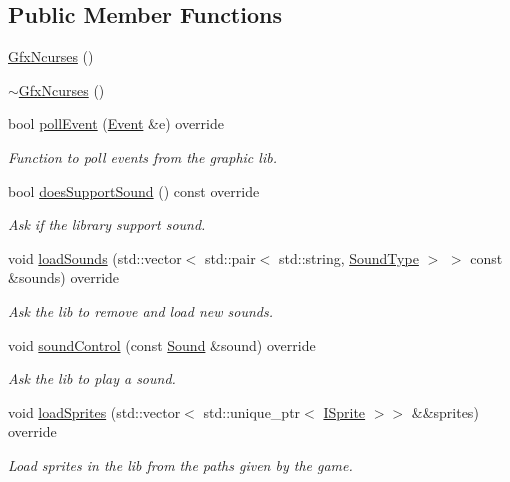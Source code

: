 \subsection*{Public Member Functions}
\begin{DoxyCompactItemize}
\item 
\hyperlink{classarcade_1_1_gfx_ncurses_a0408b1bf8ad9b35de30d82fe2c0512f2}{Gfx\+Ncurses} ()
\item 
\hyperlink{classarcade_1_1_gfx_ncurses_a462de36e41ccd26eba4e908ee3603a4b}{$\sim$\+Gfx\+Ncurses} ()
\item 
bool \hyperlink{classarcade_1_1_gfx_ncurses_aa16f7c823041b931025f750b4050318a}{poll\+Event} (\hyperlink{structarcade_1_1_event}{Event} \&e) override
\begin{DoxyCompactList}\small\item\em Function to poll events from the graphic lib. \end{DoxyCompactList}\item 
bool \hyperlink{classarcade_1_1_gfx_ncurses_ab100f60173ccd55f19c30627ace55101}{does\+Support\+Sound} () const override
\begin{DoxyCompactList}\small\item\em Ask if the library support sound. \end{DoxyCompactList}\item 
void \hyperlink{classarcade_1_1_gfx_ncurses_a450bb0bdb3a31f8733cc71cb39ddfb16}{load\+Sounds} (std\+::vector$<$ std\+::pair$<$ std\+::string, \hyperlink{namespacearcade_a3bb4743a2eea59f3927e404e6549cae5}{Sound\+Type} $>$ $>$ const \&sounds) override
\begin{DoxyCompactList}\small\item\em Ask the lib to remove and load new sounds. \end{DoxyCompactList}\item 
void \hyperlink{classarcade_1_1_gfx_ncurses_a5eabfc85f5ae13bf0592dd21add9f301}{sound\+Control} (const \hyperlink{structarcade_1_1_sound}{Sound} \&sound) override
\begin{DoxyCompactList}\small\item\em Ask the lib to play a sound. \end{DoxyCompactList}\item 
void \hyperlink{classarcade_1_1_gfx_ncurses_a6a412ec8047964035f0d75e64fd8dc44}{load\+Sprites} (std\+::vector$<$ std\+::unique\+\_\+ptr$<$ \hyperlink{classarcade_1_1_i_sprite}{I\+Sprite} $>$$>$ \&\&sprites) override
\begin{DoxyCompactList}\small\item\em Load sprites in the lib from the paths given by the game. \end{DoxyCompactList}\item 
$$
\end{DoxyCompactItemize}
